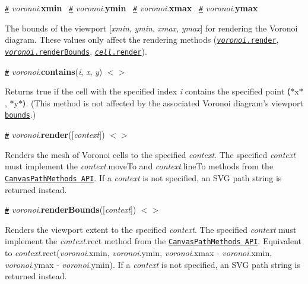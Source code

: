 \href{#voronoi_xmin}{\tt \#} {\itshape voronoi}.{\bfseries xmin}~\newline
 \href{#voronoi_ymin}{\tt \#} {\itshape voronoi}.{\bfseries ymin}~\newline
 \href{#voronoi_xmax}{\tt \#} {\itshape voronoi}.{\bfseries xmax}~\newline
 \href{#voronoi_ymax}{\tt \#} {\itshape voronoi}.{\bfseries ymax}~\newline


The bounds of the viewport \mbox{[}{\itshape xmin}, {\itshape ymin}, {\itshape xmax}, {\itshape ymax}\mbox{]} for rendering the Voronoi diagram. These values only affect the rendering methods (\href{#voronoi_render}{\tt {\itshape voronoi}.render}, \href{#voronoi_renderBounds}{\tt {\itshape voronoi}.render\+Bounds}, \href{#cell_render}{\tt {\itshape cell}.render}).

\href{#voronoi_contains}{\tt \#} {\itshape voronoi}.{\bfseries contains}({\itshape i}, {\itshape x}, {\itshape y}) \href{https://github.com/d3/d3-delaunay/blob/master/src/cell.js}{\tt $<$$>$}

Returns true if the cell with the specified index {\itshape i} contains the specified point ⟨$\ast$x$\ast$, $\ast$y$\ast$⟩. (This method is not affected by the associated Voronoi diagram’s viewport \href{#voronoi_xmin}{\tt bounds}.)

\href{#voronoi_render}{\tt \#} {\itshape voronoi}.{\bfseries render}(\mbox{[}{\itshape context}\mbox{]}) \href{https://github.com/d3/d3-delaunay/blob/master/src/voronoi.js}{\tt $<$$>$}



Renders the mesh of Voronoi cells to the specified {\itshape context}. The specified {\itshape context} must implement the {\itshape context}.move\+To and {\itshape context}.line\+To methods from the \href{https://www.w3.org/TR/2dcontext/#canvaspathmethods}{\tt Canvas\+Path\+Methods A\+PI}. If a {\itshape context} is not specified, an S\+VG path string is returned instead.

\href{#voronoi_renderBounds}{\tt \#} {\itshape voronoi}.{\bfseries render\+Bounds}(\mbox{[}{\itshape context}\mbox{]}) \href{https://github.com/d3/d3-delaunay/blob/master/src/voronoi.js}{\tt $<$$>$}



Renders the viewport extent to the specified {\itshape context}. The specified {\itshape context} must implement the {\itshape context}.rect method from the \href{https://www.w3.org/TR/2dcontext/#canvaspathmethods}{\tt Canvas\+Path\+Methods A\+PI}. Equivalent to {\itshape context}.rect({\itshape voronoi}.xmin, {\itshape voronoi}.ymin, {\itshape voronoi}.xmax -\/ {\itshape voronoi}.xmin, {\itshape voronoi}.ymax -\/ {\itshape voronoi}.ymin). If a {\itshape context} is not specified, an S\+VG path string is returned instead.

